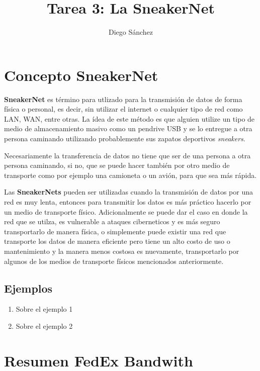 \documentclass[11pt]{article}
\author[1]{Diego Sánchez}
\title{Tarea 3: La SneakerNet}
\affil[1]{Comunicación de datos}
\affil[1]{Escuela de computacion}
\begin{document}
    \maketitle
    \section{Concepto SneakerNet}
    
    \textbf{SneakerNet} es término para utlizado para la transmisión de datos de forma física o personal, es decir, sin utilizar el internet o cualquier tipo de red como LAN, WAN, entre otras. La ídea de este método es que alguien utilize un tipo de medio de almacenamiento masivo como un pendrive USB y se lo entregue a otra persona caminando utilizando probablemente sus zapatos deportivos \textit{sneakers}. 
    
    Necesariamente la transferencia de datos no tiene que ser de una persona a otra persona caminando, si no, que se puede hacer también por otro medio de transporte como por ejemplo una camioneta o un avión, para que sea más rápida.
    
    Las \textbf{SneakerNets} pueden ser utilizadas cuando la transmisión de datos por una red es muy lenta, entonces para transmitir los datos es más práctico hacerlo por un medio de transporte físico. Adicionalmente se puede dar el caso en donde la red que se utilza, es vulnerable a ataques ciberneticos y es más seguro transportarlo de manera física, o simplemente puede existir una red que transporte los datos de manera eficiente pero tiene un alto costo de uso o mantenimiento y la manera menos costosa es nuevamente, transportarlo por algunos de los medios de transporte físicos mencionados anteriormente.
    \subsection{Ejemplos}
    \begin{enumerate}
        \item Sobre el ejemplo 1 
        \item Sobre el ejemplo 2
    \end{enumerate}
    
    \section{Resumen FedEx Bandwith}
    
\end{document}
